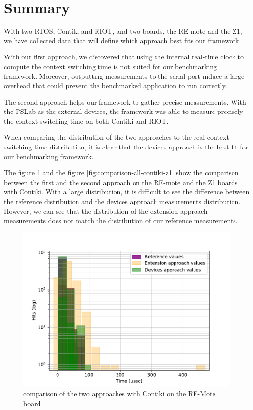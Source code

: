 \section{Summary}

With two RTOS, Contiki and RIOT, and two boards, the RE-mote and the Z1, we have collected data that will define which approach best fits our framework.

With our first approach, we discovered that using the internal real-time clock to compute the context switching time is not suited for our benchmarking framework.
Moreover, outputting measurements to the serial port induce a large overhead that could prevent the benchmarked application to run correctly.

The second approach helps our framework to gather precise measurements.
With the PSLab as the external devices, the framework was able to measure precisely the context switching time on both Contiki and RIOT.

When comparing the distribution of the two approaches to the real context switching time distribution, it is clear that the devices approach is the best fit for our benchmarking framework.

The figure \ref{fig:comparison-all-contiki-remote} and the figure \ref{fig:comparison-all-contiki-z1} show the comparison between the first and the second approach on the RE-mote and the Z1 boards with Contiki.
With a large distribution, it is difficult to see the difference between the reference distribution and the devices approach measurements distribution.
However, we can see that the distribution of the extension approach measurements does not match the distribution of our reference measurements.

\begin{figure}[!ht]
  \centering
  \includegraphics[scale=.7]{assets/comparison-all-contiki-remote.pdf}
  \caption{comparison of the two approaches with Contiki on the RE-Mote board\label{fig:comparison-all-contiki-remote}}
\end{figure}

